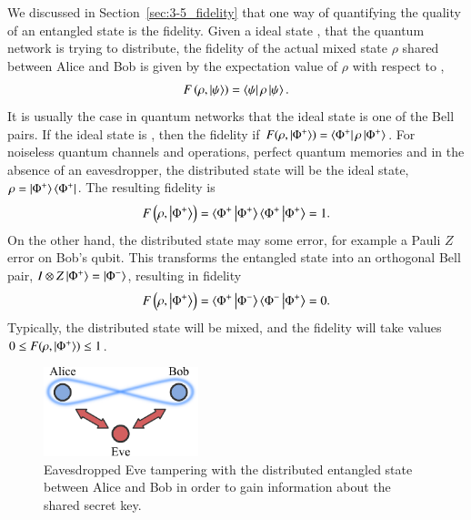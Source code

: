 We discussed in Section~\ref{sec:3-5_fidelity} that one way of quantifying the quality of an entangled state is the fidelity.
Given a ideal state \ket{\psi}, that the quantum network is trying to distribute, the fidelity of the actual mixed state $\rho$ shared between Alice and Bob is given by the expectation value of $\rho$ with respect to \ket{\psi},
\begin{equation}
    F \left( \rho, \left| \psi \right\rangle \right) = \left\langle \psi \right|\rho\left| \psi \right\rangle.
\end{equation}
It is usually the case in quantum networks that the ideal state is one of the Bell pairs.
If the ideal state is \ket{\Phi^+}, then the fidelity if $F (\rho, \left| \Phi^+ \right\rangle) = \left\langle \Phi^+ \right|\rho\left| \Phi^+ \right\rangle$.
For noiseless quantum channels and operations, perfect quantum memories and in the absence of an eavesdropper, the distributed state will be the ideal state, $\rho = \left| \Phi^+ \right\rangle\left\langle \Phi^+ \right|$.
The resulting fidelity is
\begin{equation}
    F \left( \rho, \left| \Phi^+ \right\rangle \right) = \langle\Phi^+\left| \Phi^+ \right\rangle \langle\Phi^+\left| \Phi^+ \right\rangle = 1.
\end{equation}
On the other hand, the distributed state may some error, for example a Pauli $Z$ error on Bob's qubit.
This transforms the entangled state into an orthogonal Bell pair, $I \otimes Z \left| \Phi^+ \right\rangle = \left| \Phi^- \right\rangle$, resulting in fidelity
\begin{equation}
    F \left( \rho, \ket{\Phi^+} \right) = \langle\Phi^+\ket{\Phi^-} \langle\Phi^-\ket{\Phi^+} = 0.
    \label{eq:14-1_fidelity_0}
\end{equation}
Typically, the distributed state will be mixed, and the fidelity will take values $ 0 \leq F(\rho, \left| \Phi^+ \right\rangle) \leq 1$.

\begin{figure}[t]
    \centering
    \includegraphics[width=0.4\textwidth]{lesson14/14-1_QKD.pdf}
    \caption[Eavesdropper Eve]{Eavesdropped Eve tampering with the distributed entangled state between Alice and Bob in order to gain information about the shared secret key.}
    \label{fig:14-1_QKD}
\end{figure}

